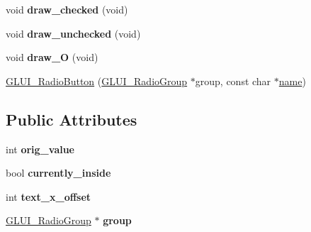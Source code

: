 \begin{DoxyCompactItemize}
\item 
\hypertarget{class_g_l_u_i___radio_button_a7877448ee5aeb07b26e045d9d4a5c23b}{void {\bfseries draw\+\_\+checked} (void)}\label{class_g_l_u_i___radio_button_a7877448ee5aeb07b26e045d9d4a5c23b}

\item 
\hypertarget{class_g_l_u_i___radio_button_af0d77a13832451f0140c41e8bc0769a0}{void {\bfseries draw\+\_\+unchecked} (void)}\label{class_g_l_u_i___radio_button_af0d77a13832451f0140c41e8bc0769a0}

\item 
\hypertarget{class_g_l_u_i___radio_button_a1591bf4a0d8b0c1e286365d973693d40}{void {\bfseries draw\+\_\+\+O} (void)}\label{class_g_l_u_i___radio_button_a1591bf4a0d8b0c1e286365d973693d40}

\item 
\hyperlink{class_g_l_u_i___radio_button_ab3bda5fa0bd41bc49b064f474513ceaf}{G\+L\+U\+I\+\_\+\+Radio\+Button} (\hyperlink{class_g_l_u_i___radio_group}{G\+L\+U\+I\+\_\+\+Radio\+Group} $\ast$group, const char $\ast$\hyperlink{class_g_l_u_i___control_aa95b97d50df45335fc33f0af03958eb3}{name})
\end{DoxyCompactItemize}
\subsection*{Public Attributes}
\begin{DoxyCompactItemize}
\item 
\hypertarget{class_g_l_u_i___radio_button_aa874a5e29d93e5e65befd745d0e16454}{int {\bfseries orig\+\_\+value}}\label{class_g_l_u_i___radio_button_aa874a5e29d93e5e65befd745d0e16454}

\item 
\hypertarget{class_g_l_u_i___radio_button_ae4bcf4b331712a2dc21f944e00071cf6}{bool {\bfseries currently\+\_\+inside}}\label{class_g_l_u_i___radio_button_ae4bcf4b331712a2dc21f944e00071cf6}

\item 
\hypertarget{class_g_l_u_i___radio_button_a857d2387855fca92f0ae322e3f6fc19a}{int {\bfseries text\+\_\+x\+\_\+offset}}\label{class_g_l_u_i___radio_button_a857d2387855fca92f0ae322e3f6fc19a}

\item 
\hypertarget{class_g_l_u_i___radio_button_ab9906e39403d7b15810384a59e99e054}{\hyperlink{class_g_l_u_i___radio_group}{G\+L\+U\+I\+\_\+\+Radio\+Group} $\ast$ {\bfseries group}}\label{class_g_l_u_i___radio_button_ab9906e39403d7b15810384a59e99e054}

\end{DoxyCompactItemize}
